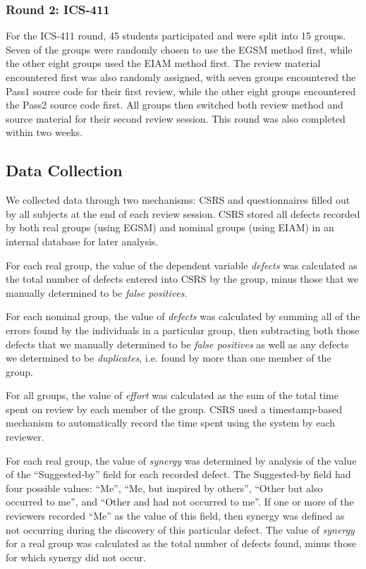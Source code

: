 \subsubsection{Round 2: ICS-411}

For the ICS-411 round, 45 students participated and were split into 15
groups. Seven of the groups were randomly chosen to use the EGSM method
first, while the other eight groups used the EIAM method first.  The 
review material encountered first was also randomly assigned, with seven
groups encountered the Pass1 source code for their first review, while the
other eight groups encountered the Pass2 source code first.  All groups
then switched both review method and source material for their second
review session. This round was also completed within two weeks. 

\subsection{Data Collection}

We collected data through two mechanisms: CSRS and questionnaires filled
out by all subjects at the end of each review session.  CSRS stored
all defects recorded by both real groups (using EGSM) and nominal groups
(using EIAM) in an internal database for later analysis.

For each real group, the value of the dependent variable {\em defects} was
calculated as the total number of defects entered into CSRS by the group,
minus those that we manually determined to be {\em false positives}.

For each nominal group, the value of {\em defects} was calculated by summing
all of the errors found by the individuals in a particular group, then
subtracting both those defects that we manually determined to be {\em false
  positives} as well as any defects we determined to be {\em duplicates},
i.e. found by more than one member of the group. 

For all groups, the value of {\em effort} was calculated as the sum of the
total time spent on review by each member of the group.  CSRS used a
timestamp-based mechanism to automatically record the time spent 
using the system by each reviewer. 

For each real group, the value of {\em synergy} was determined by analysis
of the value of the ``Suggested-by'' field for each recorded defect. The
Suggested-by field had four possible values: ``Me'', ``Me, but inspired by
others'', ``Other but also occurred to me'', and ``Other and had not
occurred to me''.  If one or more of the reviewers recorded ``Me'' as the
value of this field, then synergy was defined as not occurring during the
discovery of this particular defect. The value of {\em synergy} for 
a real group was calculated as the total number of defects found, minus
those for which synergy did not occur. 

